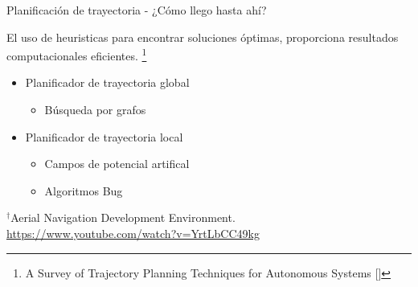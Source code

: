 \documentclass[
  24pt, %
  aspectratio=169, %
]{beamer}
\begin{document}
\begin{frame}{Planificación de trayectoria - ¿Cómo llego hasta ahí?}
  \begin{minipage}{0.47\textwidth}

    El uso de heuristicas para encontrar soluciones óptimas, proporciona resultados computacionales eficientes. \footnote{A Survey of Trajectory Planning Techniques for Autonomous Systems [\cite{Mir2022}]} 
    \bigskip %
    \begin{itemize}
    \item Planificador de trayectoria global
      \begin{itemize}
      \item Búsqueda por grafos
      \end{itemize}
      \bigskip %
    \item Planificador de trayectoria local
      \begin{itemize}
      \item Campos de potencial artifical
      \item Algoritmos Bug
      \end{itemize}
    \end{itemize}
    \bigskip %
  \end{minipage}
  \hspace{0.2cm}
  \begin{minipage}{0.5\textwidth}
    \centering
    \rule{0in}{1.2em}$^\dag$\scriptsize Aerial Navigation Development Environment.\\
    \tiny \url{https://www.youtube.com/watch?v=YrtLbCC49kg} 
  \end{minipage}
  
\end{frame}
\end{document}
